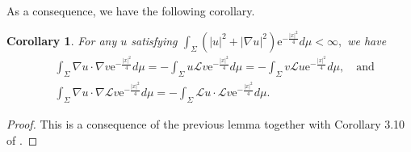 \documentclass[12pt]{amsart}
\numberwithin{equation}{section}
\newtheorem{corollary}[theorem]{Corollary}
\numberwithin{equation}{section}
\newcommand{\cL}{\mathcal{L}}
\begin{document}
	As a consequence, we have the following corollary.
	
	\begin{corollary}\label{cor:integration by parts}
		For any $u$ satisfying
		$		\int_\Sigma (|u|^2+|\nabla u|^2)\mathrm{e}^{-\frac{|x|^2}{4}}d\mu <\infty,$
		we have 
		\begin{equation*}
			\begin{aligned}
				&\int_{\Sigma} \nabla u\cdot \nabla v \mathrm{e}^{-\frac{|x|^2}{4}}d\mu
				=
				-\int_{\Sigma} u \cL v \mathrm{e}^{-\frac{|x|^2}{4}}d\mu
				=
				-\int_{\Sigma} v \cL u   \mathrm{e}^{-\frac{|x|^2}{4}}d\mu,\quad \mathrm{and}\\ 
				&		\int_{\Sigma} \nabla u\cdot \nabla \cL v \mathrm{e}^{-\frac{|x|^2}{4}}d\mu
				=
				-\int_{\Sigma} \cL u \cdot \cL v \mathrm{e}^{-\frac{|x|^2}{4}}d\mu.
			\end{aligned}
		\end{equation*}
	\end{corollary}
	
	\begin{proof}
		This is a consequence of the previous lemma together with Corollary 3.10 of \cite{CM1}.
	\end{proof}
	
\end{document}
